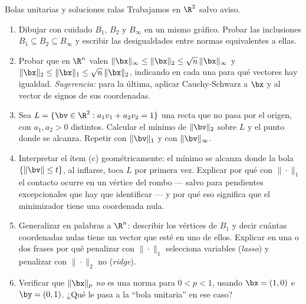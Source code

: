 \begin{entrega}{Bolas unitarias y soluciones ralas}\label{ent:bolas}
Trabajamos en $\R^2$ salvo aviso.
\begin{enumerate}[label=\textbf{(\alph*)},itemsep=3pt,topsep=4pt]
\item Dibujar con cuidado $B_1$, $B_2$ y $B_\infty$ en un mismo gráfico.
Probar las inclusiones $B_1\subseteq B_2\subseteq B_\infty$ y escribir las
desigualdades entre normas equivalentes a ellas.

\item Probar que en $\R^n$ valen
$\|\bx\|_\infty\le\|\bx\|_2\le\sqrt n\,\|\bx\|_\infty$ y
$\|\bx\|_2\le\|\bx\|_1\le\sqrt n\,\|\bx\|_2$, indicando en cada una para qué
vectores hay igualdad. \emph{Sugerencia:} para la última, aplicar
Cauchy-Schwarz a $\bx$ y al vector de signos de sus coordenadas.

\item Sea $L=\{\bv\in\R^2 : a_1v_1+a_2v_2=1\}$ una recta que no pasa por el
origen, con $a_1,a_2>0$ distintos. Calcular el mínimo de $\|\bv\|_2$ sobre
$L$ y el punto donde se alcanza. Repetir con $\|\bv\|_1$ y con
$\|\bv\|_\infty$.

\item Interpretar el ítem (c) geométricamente: el mínimo se alcanza donde la
bola $\{\|\bv\|\le t\}$, al inflarse, toca $L$ por primera vez. Explicar por
qué con $\|\cdot\|_1$ el contacto ocurre en un vértice del rombo --- salvo
para pendientes excepcionales que hay que identificar --- y por qué eso
significa que el minimizador tiene una coordenada nula.

\item Generalizar en palabras a $\R^n$: describir los vértices de $B_1$ y
decir cuántas coordenadas nulas tiene un vector que esté en uno de ellos.
Explicar en una o dos frases por qué penalizar con $\|\cdot\|_1$ selecciona
variables (\emph{lasso}) y penalizar con $\|\cdot\|_2$ no (\emph{ridge}).

\item Verificar que $\|\bx\|_p$ \emph{no} es una norma para $0<p<1$, usando
$\bx=(1,0)$ e $\by=(0,1)$. ¿Qué le pasa a la ``bola unitaria'' en ese caso?
\end{enumerate}

\medskip
{}
\end{entrega}

